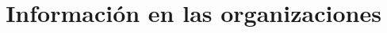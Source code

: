 \documentclass[12pt,titlepage]{report}
\begin{document}


\pagestyle{fancy}
\renewcommand{\sectionmark}[1]{\markboth{}{\thesection\ \ #1}}
\lhead{}
\chead{}
\rhead{\rightmark}
\lfoot{}
\cfoot{}
\rfoot{\thepage}



\title{Información en las organizaciones}
\author{}


\end{document}
